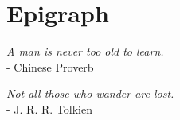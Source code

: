 \newpage
\restoregeometry

\begingroup
\renewcommand{\cleardoublepage}{}
\chapter*{Epigraph}
\endgroup


\vspace*{\fill}

\begin{flushright}
    {\textsl{A man is never too old to learn.} \\ - Chinese Proverb}
\end{flushright}

\vspace{1.5cm}

\begin{flushright}
    {\textsl{Not all those who wander are lost.} \\ - J. R. R. Tolkien}
\end{flushright}

\vspace*{\fill}
